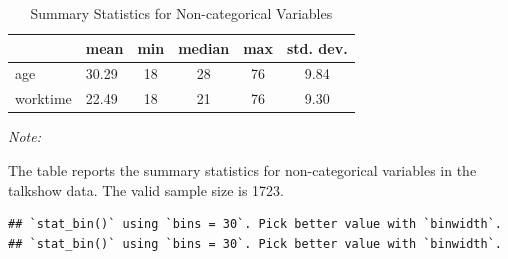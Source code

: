 \documentclass[
  12pt,
]{article}
\begin{document}
\begin{table}[H]

\caption{\label{tab:unnamed-chunk-3}Summary Statistics for Non-categorical Variables}
\centering
\begin{threeparttable}
\begin{tabular}[t]{llcccc}
\toprule
  & mean & min & median & max & std. dev.\\
\midrule
age & 30.29 & 18 & 28 & 76 & 9.84\\
worktime & 22.49 & 18 & 21 & 76 & 9.30\\
\bottomrule
\end{tabular}
\begin{tablenotes}
\item \textit{Note: } 
\item The table reports the summary statistics for non-categorical variables in the talkshow data. The valid sample size is 1723.
\end{tablenotes}
\end{threeparttable}
\end{table}

\begin{verbatim}
## `stat_bin()` using `bins = 30`. Pick better value with `binwidth`.
## `stat_bin()` using `bins = 30`. Pick better value with `binwidth`.
\end{verbatim}
\end{document}
